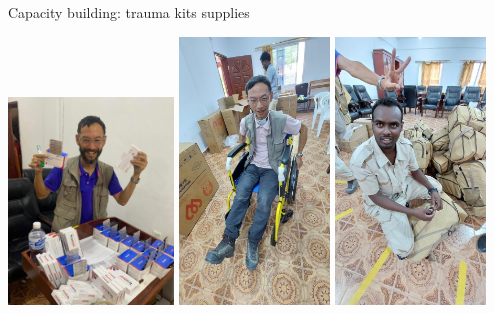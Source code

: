 \documentclass[aspectratio=169]{beamer}
\begin{document}
\begin{frame}{Capacity building: trauma kits supplies}
    \begin{center}
        \includegraphics[width=0.33\textwidth]{4875890938550512937.32a296a9eebb4034c36c698f4a25d9d0.23050612.JPG}
        \includegraphics[width=0.30\textwidth]{IMG-2655.JPG}
        \includegraphics[width=0.30\textwidth]{IMG-2313.JPG}
    \end{center}
\end{frame}
\end{document}
